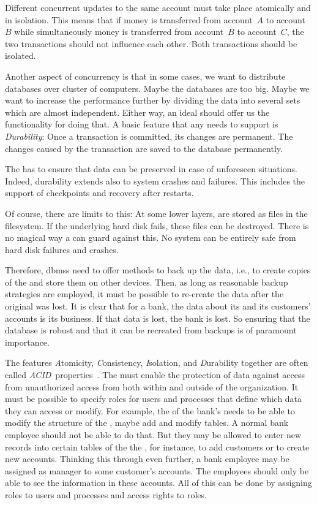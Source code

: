 Different concurrent updates to the same account must take place atomically and in isolation.
This means that if money is transferred from account~$A$ to account~$B$ while simultaneously money is transferred from account~$B$ to account~$C$, the two transactions should not influence each other.
Both transactions should be isolated.

Another aspect of concurrency is that in some cases, we want to distribute databases over cluster of computers.
Maybe the databases are too big.
Maybe we want to increase the performance further by dividing the data into several sets which are almost independent.
Either way, an ideal  should offer us the functionality for doing that.%
\endhsection%
%
%
%
A basic feature that any  needs to support is \emph{Durability}:
Once a transaction is committed, its changes are permanent.
The changes caused by the transaction are saved to the database permanently.

The  has to ensure that data can be preserved in case of unforeseen situations.
Indeed, durability extends also to system crashes and failures.
This includes the support of checkpoints and recovery after restarts.

Of course, there are limits to this:
At some lower layers,  are stored as files in the filesystem.
If the underlying hard disk fails, these files can be destroyed.
There is no magical way a  can guard against this.
No system can be entirely safe from hard disk failures and crashes.

Therefore, \glspl{dbms} need to offer methods to back up the data, i.e., to create copies of the  and store them on other devices.
Then, as long as reasonable backup strategies are employed, it must be possible to re-create the data after the original  was lost.
It is clear that for a bank, the data about its and its customers' accounts is its business.
If that data is lost, the bank is lost.
So ensuring that the database is robust and that it can be recreated from backups is of paramount importance.%
\endhsection%

The features \emph{A}tomicity, \emph{C}onsistency, \emph{I}solation, and \emph{D}urability together are often called \emph{ACID}~properties~\cite{GR1992TPCAT,WV2001TISTAATPOCCAR}.
%
\label{sec:featuresDataPrivacyAndSecurity}%
The  must enable the protection of data against access from unauthorized access from both within and outside of the organization.
It must be possible to specify roles for users and processes that define which data they can access or modify.
For example, the  of the bank's  needs to be able to modify the structure of the , maybe add and modify tables.
A normal bank employee should not be able to do that.
But they may be allowed to enter new records into certain tables of the the , for instance, to add customers or to create new accounts.
Thinking this through even further, a bank employee may be assigned as manager to some customer's accounts.
The employees should only be able to see the information in these accounts.
All of this can be done by assigning roles to users and processes and access rights to roles.

